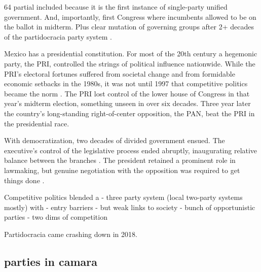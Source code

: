\documentclass[letter,12pt]{article}
\begin{document}
64 partial included because it is the first instance of single-party unified government. And, importantly, first Congress where incumbents allowed to be on the ballot in midterm. Plus clear mutation of governing groups after 2+ decades of the partidocracia party system \citep{magar.2007ref.2015,magar.estevez.rosas.2010}. 


Mexico has a presidential constitution. For most of the 20th century a hegemonic party, the PRI, controlled the strings of political influence nationwide. While the PRI's electoral fortunes suffered from societal change and from formidable economic setbacks in the 1980s, it was not until 1997 that competitive politics became the norm \citep{cosio.villegas.1981,molinar.1991a,cornelius.1996}. The PRI lost control of the lower house of Congress in that year's midterm election, something unseen in over six decades. Three year later the country's long-standing right-of-center opposition, the PAN, beat the PRI in the presidential race. 


With democratization, two decades of divided government ensued. The executive's control of the legislative process ended abruptly, inaugurating relative balance between the branches \citep{weldon.1997,lujambio.segl.2000}. The president retained a prominent role in lawmaking, but genuine negotiation with the opposition was required to get things done \citep{casarSinMay2013,bejarQuienLegisla2012}. 


Competitive politics blended a
- three party system (local two-party systems mostly) with 
- entry barriers
- but weak links to society
- bunch of opportunistic parties
- two dims of competition

Partidocracia came crashing down in 2018.

  \subsection{parties in camara}
\end{document}
